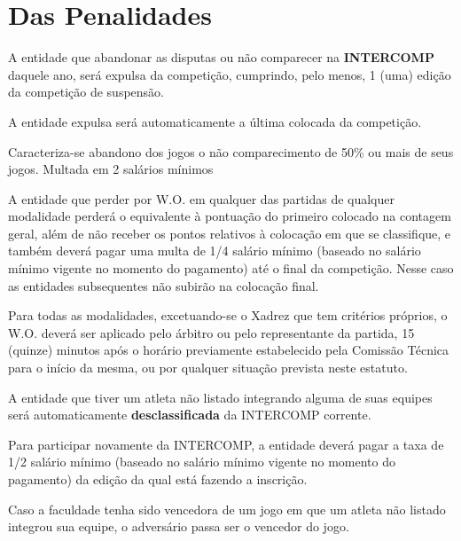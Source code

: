 {\let\clearpage\relax \chapter{Das Penalidades}}

\begin{article}
	A entidade que abandonar as disputas ou não comparecer na \textbf{INTERCOMP} daquele ano, será expulsa da competição, cumprindo, pelo menos, 1 (uma) edição da competição de suspensão.

	\begin{xparagraph}
		A entidade expulsa será automaticamente a última colocada da competição.
	\end{xparagraph}

	\begin{xparagraph}
		Caracteriza-se abandono dos jogos o não comparecimento de 50\% ou mais de seus jogos. Multada em 2 salários mínimos
	\end{xparagraph}
\end{article}

\begin{article}
	A entidade que perder por W.O. em qualquer das partidas de qualquer modalidade perderá o equivalente à pontuação do primeiro colocado na contagem geral, além de não receber os pontos relativos à colocação em que se classifique, e também deverá pagar uma multa de 1/4 salário mínimo (baseado no salário mínimo vigente no momento do pagamento) até o final da competição. Nesse caso as entidades subsequentes não subirão na colocação final.

	\begin{xparagraph}
		Para todas as modalidades, excetuando-se o Xadrez que tem critérios próprios, o W.O. deverá ser aplicado pelo árbitro ou pelo representante da partida, 15 (quinze) minutos após o horário previamente estabelecido pela Comissão Técnica para o início da mesma, ou por qualquer situação prevista neste estatuto.
	\end{xparagraph}
\end{article}

\begin{article}
	A entidade que tiver um atleta não listado integrando alguma de suas equipes será automaticamente \textbf{desclassificada} da INTERCOMP corrente.

	\begin{xparagraph}
		Para participar novamente da INTERCOMP, a entidade deverá pagar a taxa de 1/2 salário mínimo (baseado no salário mínimo vigente no momento do pagamento) da edição da qual está fazendo a inscrição.
	\end{xparagraph}

	\begin{xparagraph}
		Caso a faculdade tenha sido vencedora de um jogo em que um atleta não listado integrou sua equipe, o adversário passa ser o vencedor do jogo.
	\end{xparagraph}
\end{article}

